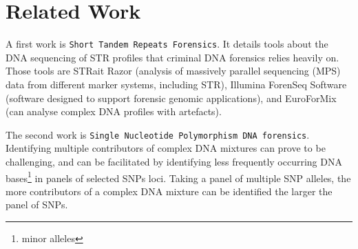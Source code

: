 \documentclass[../main.tex]{subfiles}
\begin{document}
\section{Related Work}

A first work is \texttt{Short Tandem Repeats Forensics}. It details tools about the DNA sequencing of STR profiles that criminal DNA forensics relies heavily on. Those tools are STRait Razor (analysis of massively parallel sequencing (MPS) data from different marker systems, including STR), Illumina ForenSeq Software (software designed to support forensic genomic applications), and EuroForMix (can analyse complex DNA profiles with artefacts).

The second work is \texttt{Single Nucleotide Polymorphism DNA forensics}. Identifying multiple contributors of complex DNA mixtures can prove to be challenging, and can be facilitated by identifying less frequently occurring DNA bases\footnote{minor alleles} in panels of selected SNPs loci. Taking a panel of multiple SNP alleles, the more contributors of a complex DNA mixture can be identified the larger the panel of SNPs.
  
\end{document}
